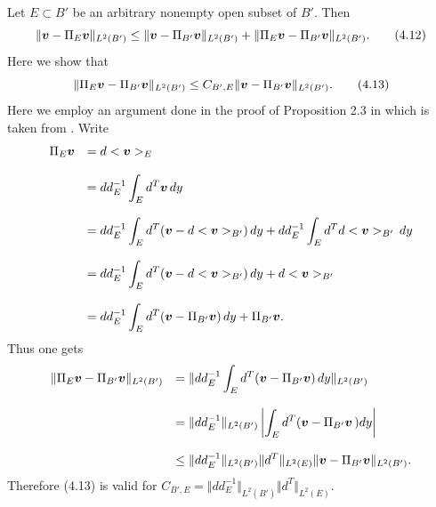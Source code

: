 Let $E\subset B'$ be an arbitrary nonempty open subset of $B'$.
Then
$$\displaystyle
\Vert\mbox{\boldmath $v$}-\Pi_{E}\mbox{\boldmath $v$}\Vert_{L^2(B')}
\le \Vert\mbox{\boldmath $v$}-\Pi_{B'}\mbox{\boldmath $v$}\Vert_{L^2(B')}
+\Vert\Pi_E\mbox{\boldmath $v$}-\Pi_{B'}\mbox{\boldmath $v$}\Vert_{L^2(B')}.
\tag {4.12}
$$
Here we show that
$$
\displaystyle
\Vert\Pi_{E}\mbox{\boldmath $v$}-\Pi_{B'}\mbox{\boldmath $v$}\Vert_{L^2(B')}
\le
C_{B',E}\Vert\mbox{\boldmath $v$}-\Pi_{B'}\mbox{\boldmath $v$}\Vert_{L^2(B')}.
\tag {4.13}
$$
Here we employ an argument done in the proof of Proposition 2.3 in \cite{INew} which is taken from \cite{SS}.
Write
$$\begin{array}{ll}
\displaystyle
\Pi_E\mbox{\boldmath $v$}
&
\displaystyle
=d<\mbox{\boldmath $v$}>_E\\
\\
\displaystyle
&
\displaystyle
=dd_E^{-1}\int_E d^T\mbox{\boldmath $v$}\,dy
\\
\\
\displaystyle
&
\displaystyle
=dd_E^{-1}\int_E d^T(\mbox{\boldmath $v$}-d<\mbox{\boldmath $v$}>_{B'})\,dy
+dd_E^{-1}\int_Ed^Td<\mbox{\boldmath $v$}>_{B'}\,dy
\\
\\
\displaystyle
&
\displaystyle
=dd_E^{-1}\int_E d^T(\mbox{\boldmath $v$}-d<\mbox{\boldmath $v$}>_{B'})\,dy
+d<\mbox{\boldmath $v$}>_{B'}
\\
\\
\displaystyle
&
\displaystyle
=dd_E^{-1}\int_E d^T(\mbox{\boldmath $v$}-\Pi_{B'}\mbox{\boldmath $v$})\,dy
+\Pi_{B'}\mbox{\boldmath $v$}.
\end{array}
$$
Thus one gets
$$
\begin{array}{ll}
\displaystyle
\Vert\Pi_{E}\mbox{\boldmath $v$}-\Pi_{B'}\mbox{\boldmath $v$}\Vert_{L^2(B')}
&
\displaystyle
=\Vert dd_E^{-1}\int_E d^T(\mbox{\boldmath $v$}-\Pi_{B'}\mbox{\boldmath $v$})\,dy\Vert_{L^2(B')}
\\
\\
\displaystyle
&
\displaystyle
=\Vert dd_E^{-1}\Vert_{L^2(B')}
\left\vert
\int_E d^T(\mbox{\boldmath $v$}-\Pi_{B'}\mbox{\boldmath $v$}\,)dy\right\vert
\\
\\
\displaystyle
&
\displaystyle
\le
\Vert dd_E^{-1}\Vert_{L^2(B')}
\Vert d^T\Vert_{L^2(E)}
\Vert\mbox{\boldmath $v$}-\Pi_{B'}\mbox{\boldmath $v$}\Vert_{L^2(B')}.
\end{array}
$$
Therefore (4.13) is valid for $C_{B',E}=\Vert dd_E^{-1}\Vert_{L^2(B')}
\Vert d^T\Vert_{L^2(E)}$.

